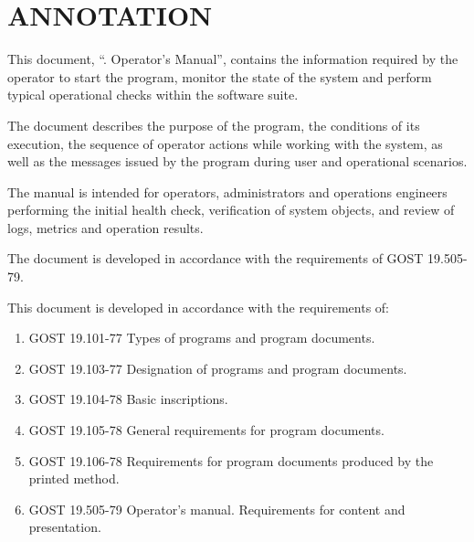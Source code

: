 \documentclass[12pt,a4paper]{extarticle}
\begin{document}
\sloppy




\section*{ANNOTATION}

This document, \enquote{\projectname. Operator's Manual}, contains the information required by the operator to start the program, monitor the state of the system and perform typical operational checks within the software suite.

The document describes the purpose of the program, the conditions of its execution, the sequence of operator actions while working with the system, as well as the messages issued by the program during user and operational scenarios.

The manual is intended for operators, administrators and operations engineers performing the initial health check, verification of system objects, and review of logs, metrics and operation results.

The document is developed in accordance with the requirements of GOST 19.505-79\cite{gost19505}.

\clearpage

\noindent
This document is developed in accordance with the requirements of:

\begin{enumerate}[label=\arabic*), leftmargin=1.25cm]
\item GOST 19.101-77 Types of programs and program documents\cite{gost19101}.
\item GOST 19.103-77 Designation of programs and program documents\cite{gost19103}.
\item GOST 19.104-78 Basic inscriptions\cite{gost19104}.
\item GOST 19.105-78 General requirements for program documents\cite{gost19105}.
\item GOST 19.106-78 Requirements for program documents produced by the printed method\cite{gost19106}.
\item GOST 19.505-79 Operator's manual. Requirements for content and presentation\cite{gost19505}.
\end{enumerate}
\end{document}
